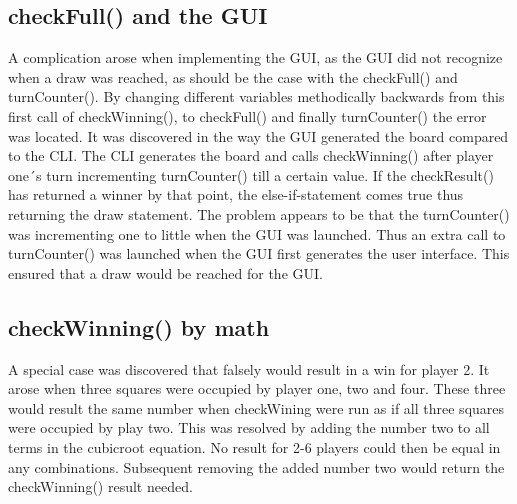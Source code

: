 \documentclass[a4paper,10pt]{article}
\begin{document}
	\subsection{checkFull() and the GUI}
	A complication arose when implementing the GUI, as the GUI did not recognize when a draw was reached, as should be the case with the checkFull() and turnCounter(). By changing different variables methodically backwards from this first call of checkWinning(), to checkFull() and finally turnCounter() the error was located. It was discovered in the way the GUI generated the board compared to the CLI.  The CLI generates the board and calls checkWinning() after player one´s turn incrementing turnCounter() till a certain value. If the checkResult() has returned a winner by that point, the else-if-statement comes true thus returning the draw statement.  
	The problem appears to be that the turnCounter() was incrementing one to little when the GUI was launched. Thus an extra call to turnCounter() was launched when the GUI first generates the user interface. This ensured that a draw would be reached for the GUI.
	
	\subsection{checkWinning() by math}
	A special case was discovered that falsely would result in a win for player 2. It arose when three squares were occupied by player one, two and four. These three would result the same number when checkWining were run as if all three squares were occupied by play two.
	This was resolved by adding the number two to all terms in the cubicroot equation. No result for 2-6 players could then be equal in any combinations. Subsequent removing the added number two would return the checkWinning() result needed.
	
	
	\begin{comment}
	I testing skal i forklare jeres tests osv. udover det kan i have et billede med
	som i kan tilføje ved at kopiere includegraphics som herunder.
	
	\begin{figure}[H]\center
	\texttt{[image: billede.png]}
	\caption{}
	\end{figure}
	
	udskift billede.png med jeres billede fil som skal ligge i samme mappe som .tex
	i kan ændre på scale for at �?¦ndre p�?¥ billede størrelse i pdfen.
	\end{comment}
	
\end{document}
